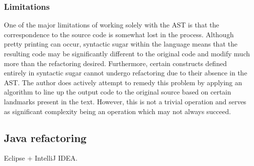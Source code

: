 \subsubsection{Limitations}
One of the major limitations of working solely with the AST is that the correspondence to the source code is somewhat lost in the process. Although pretty printing can occur, syntactic sugar within the language means that the resulting code may be significantly different to the original code and modify much more than the refactoring desired. Furthermore, certain constructs defined entirely in syntactic sugar cannot undergo refactoring due to their absence in the AST. The author does actively attempt to remedy this problem by applying an algorithm to line up the output code to the original source based on certain landmarks present in the text. However, this is not a trivial operation and serves as significant complexity being an operation which may not always succeed.

\subsection{Java refactoring}
Eclipse + IntelliJ IDEA. 
